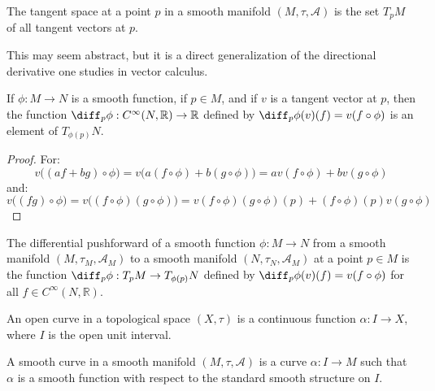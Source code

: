         \begin{definition}
            The tangent space at a point $p$ in a smooth manifold
            $(M,\tau,\mathcal{A})$ is the set $T_{p}M$ of all tangent vectors
            at $p$.
        \end{definition}
        This may seem abstract, but it is a direct generalization of the
        directional derivative one studies in vector calculus.
        \begin{theorem}
            If $\phi:M\rightarrow{N}$ is a smooth function, if $p\in{M}$, and if
            $v$ is a tangent vector at $p$, then the function
            $\diff_{p}\phi:C^{\infty}(N,\mathbb{R})\rightarrow\mathbb{R}$
            defined by $\diff_{p}\phi(v)(f)=v(f\circ\phi)$ is an element of
            $T_{\phi(p)}N$.
        \end{theorem}
        \begin{proof}
            For:
            \begin{equation}
                v\big((af+bg)\circ\phi\big)
                =v\big(a(f\circ\phi)+b(g\circ\phi)\big)
                =av(f\circ\phi)+bv(g\circ\phi)
            \end{equation}
            and:
            \begin{equation}
                v\big((fg)\circ\phi\big)
                =v\big((f\circ\phi)(g\circ\phi)\big)
                =v(f\circ\phi)(g\circ\phi)(p)+(f\circ\phi)(p)v(g\circ\phi)
            \end{equation}
        \end{proof}
        \begin{definition}
            The differential pushforward of a smooth function
            $\phi:M\rightarrow{N}$ from a smooth manifold
            $(M,\tau_{M},\mathcal{A}_{M})$ to a smooth manifold
            $(N,\tau_{N},\mathcal{A}_{M})$ at a point $p\in{M}$ is the function
            $\diff_{p}\phi:T_{p}M\rightarrow{T}_{\phi(p)}N$ defined by
            $\diff_{p}\phi(v)(f)=v(f\circ\phi)$ for all
            $f\in{C}^{\infty}(N,\mathbb{R})$.
        \end{definition}
        \begin{definition}
            An open curve in a topological space $(X,\tau)$ is a continuous
            function $\alpha:I\rightarrow{X}$, where $I$ is the open unit
            interval.
        \end{definition}
        \begin{definition}
            A smooth curve in a smooth manifold $(M,\tau,\mathcal{A})$ is a
            curve $\alpha:I\rightarrow{M}$ such that $\alpha$ is a smooth
            function with respect to the standard smooth structure on $I$.
        \end{definition}
